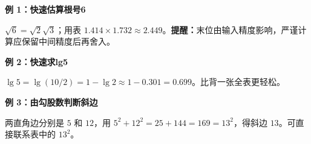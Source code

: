 \clearpage
\begin{examplebox}
\textbf{\textcolor{CExample}{例 1：快速估算根号6}}
\par\medskip
\begin{center}

\end{center}
\medskip
$\sqrt6=\sqrt2\sqrt3$；用表 $1.414\times1.732\approx2.449$。\textbf{提醒：}末位由输入精度影响，严谨计算应保留中间精度后再舍入。
\end{examplebox}
\clearpage
\begin{examplebox}
\textbf{\textcolor{CExample}{例 2：快速求lg5}}
\par\medskip
\begin{center}

\end{center}
\medskip
$\lg5=\lg(10/2)=1-\lg2\approx1-0.301=0.699$。比背一张全表更轻松。
\end{examplebox}
\clearpage
\begin{examplebox}
\textbf{\textcolor{CExample}{例 3：由勾股数判断斜边}}
\par\medskip
\begin{center}

\end{center}
\medskip
两直角边分别是 $5$ 和 $12$，用 $5^2+12^2=25+144=169=13^2$，得斜边 $13$。可直接联系表中的 $13^2$。
\end{examplebox}
